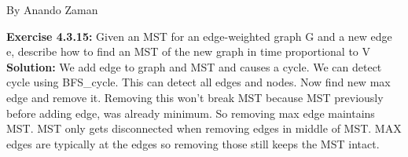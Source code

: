 \documentclass[11pt,fleqn]{article}
\begin{document}
By Anando Zaman


\textbf{Exercise 4.3.15:} Given an MST for an edge-weighted graph G and a new edge e, describe how to
find an MST of the new graph in time proportional to V\\

\textbf{Solution:} We add edge to graph and MST and causes a cycle. We can detect cycle using BFS\_cycle. This can detect all edges and nodes. Now find new max edge and remove it. Removing this won't break MST because MST previously before adding edge, was already minimum. So removing max edge maintains MST. MST only gets disconnected when removing edges in middle of MST. MAX edges are typically at the edges so removing those still keeps the MST intact.


	
\end{document}
